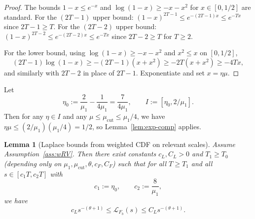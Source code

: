 \documentclass[11pt]{article}
\newtheorem{lemma}{Lemma}
\begin{document}
\begin{proof}
The bounds $1-x\le e^{-x}$ and $\log(1-x)\ge -x-x^2$ for $x\in[0,1/2]$ are standard.
For the $(2T-1)$ upper bound: $(1-x)^{2T-1}\le e^{-(2T-1)x}\le e^{-Tx}$ since $2T-1\ge T$.
For the $(2T-2)$ upper bound: $(1-x)^{2T-2}\le e^{-(2T-2)x}\le e^{-Tx}$ since $2T-2\ge T$ for $T\ge 2$.

For the lower bound, using $\log(1-x)\ge -x-x^2$ and $x^2\le x$ on $[0,1/2]$,
\[
(2T-1)\log(1-x)\ge -(2T-1)(x+x^2)\ge -2T(x+x^2)\ge -4Tx,
\]
and similarly with $2T-2$ in place of $2T-1$. Exponentiate and set $x=\eta\mu$.
\end{proof}

Let
\[
\eta_0:=\frac{2}{\mu_1}-\frac{1}{4\mu_1}=\frac{7}{4\mu_1},
\qquad
I:=[\eta_0,2/\mu_1].
\]
Then for any $\eta\in I$ and any $\mu\le\mu_{\mathrm{cut}}\le\mu_1/4$,
we have $\eta\mu\le (2/\mu_1)(\mu_1/4)=1/2$, so Lemma~\ref{lem:exp-comp} applies.

\begin{lemma}[Laplace bounds from weighted CDF on relevant scales]\label{lem:laplace}
Assume Assumption~\ref{ass:wRV}. Then there exist constants $c_L,C_L>0$ and $T_1\ge T_0$
(depending only on $\mu_1,\mu_{\mathrm{cut}},\theta,c_F,C_F$) such that for all
$T\ge T_1$ and all $s\in[c_1 T,c_2 T]$ with
\[
c_1:=\eta_0,\qquad c_2:=\frac{8}{\mu_1},
\]
we have
\[
c_L s^{-(\theta+1)}\le \mathcal L_{F_b}(s)\le C_L s^{-(\theta+1)}.
\]
\end{lemma}
\end{document}
